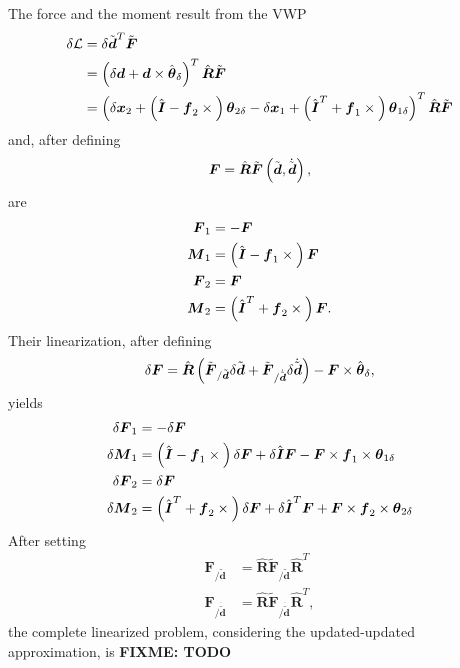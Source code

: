\documentclass[10pt,dvips,fleqn]{report}
\newcommand{\T}[1]{\boldsymbol{#1}}
\begin{document}
The force and the moment result from the VWP
\begin{align}
	\delta\mathcal{L} &= \delta \tilde{\T{d}}^T \tilde{\T{F}} \\
	&= \plbr{
		\delta\T{d}
		+ \T{d} \times \hat{\T{\theta}}_{\delta}
	}^T \hat{\T{R}} \tilde{\T{F}} \\
	&= \plbr{
		\delta\T{x}_2
		+ \plbr{
			\hat{\T{I}}
			- \T{f}_2\times{}
		} \T{\theta}_{2\delta}
		- \delta\T{x}_1
		+ \plbr{
			\hat{\T{I}}^T
			+ \T{f}_1\times{}
		} \T{\theta}_{1\delta}
	}^T \hat{\T{R}} \tilde{\T{F}}
\end{align}
and,
after defining
\begin{equation}
	\T{F} = \hat{\T{R}}
		\tilde{\T{F}}\plbr{\tilde{\T{d}}, \dot{\tilde{\T{d}}}} ,
\end{equation}
 are
\begin{align}
	\T{F}_1 &= - \T{F} \\
	\T{M}_1 &= \plbr{
		\hat{\T{I}}
		- \T{f}_1 \times{}
	} \T{F} \\
	\T{F}_2 &= \T{F} \\
	\T{M}_2 &= \plbr{
		\hat{\T{I}}^T
		+ \T{f}_2 \times{}
	} \T{F} .
\end{align}
Their linearization, after defining
\begin{equation}
	\delta\T{F} = \hat{\T{R}} \plbr{
		\tilde{\T{F}}_{/\tilde{\T{d}}} \delta{\tilde{\T{d}}}
		+ \tilde{\T{F}}_{/\dot{\tilde{\T{d}}}} \delta\dot{\tilde{\T{d}}}
	} - \T{F} \times \hat{\T{\theta}}_{\delta} ,
\end{equation}
yields
\begin{align}
	\delta\T{F}_1 &= - \delta\T{F} \\
	\delta\T{M}_1 &= \plbr{
		\hat{\T{I}}
		- \T{f}_1 \times{}
	} \delta\T{F}
	+ \delta\hat{\T{I}} \T{F} - \T{F} \times \T{f}_1 \times \T{\theta}_{1\delta} \\
	\delta\T{F}_2 &= \delta\T{F} \\
	\delta\T{M}_2 &= \plbr{
		\hat{\T{I}}^T
		+ \T{f}_2 \times{}
	} \delta\T{F}
	+ \delta\hat{\T{I}}^T \T{F} + \T{F} \times \T{f}_2 \times \T{\theta}_{2\delta}
\end{align}
After setting
\begin{align}
	\T{F}_{/\tilde{\T{d}}} &=
		\hat{\T{R}} \tilde{\T{F}}_{/\tilde{\T{d}}} \hat{\T{R}}^T \\
	\T{F}_{/\dot{\tilde{\T{d}}}} &=
		\hat{\T{R}} \tilde{\T{F}}_{/\dot{\tilde{\T{d}}}} \hat{\T{R}}^T
	,
\end{align}
the complete linearized problem, considering the updated-updated 
approximation, is
\textbf{FIXME: TODO}
\end{document}
